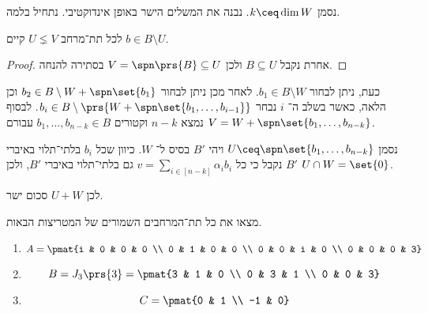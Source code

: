 \documentclass[article, 10pt,oneside]{article}
\begin{document}
\begin{solution}
נסמן
$k \ceq \dim W$.
נבנה את המשלים הישר באופן אינדוקטיבי. נתחיל בלמה.

\begin{lemma}
לכל תת־מרחב
$U \lneq V$
קיים
$b \in B \setminus U$.
\end{lemma}
\begin{proof}
אחרת נקבל
$B \subseteq U$
ולכן
$V = \spn\prs{B} \subseteq U$
בסתירה להנחה.
\end{proof}

כעת, ניתן לבחור
$b_1 \in B \setminus W$.
לאחר מכן ניתן לבחור
$b_2 \in B \setminus W + \spn\set{b_1}$
וכן הלאה, כאשר בשלב ה־%
$i$
נבחר
$b_i \in B \setminus \prs{W + \spn\set{b_1, \ldots, b_{i-1}}}$.
לבסוף נמצא
$n-k$
וקטורים
$b_1, \ldots, b_{n-k} \in B$
עבורם
$V = W + \spn\set{b_1, \ldots, b_{n-k}}$.

נסמן
$U \ceq \spn\set{b_1, \ldots, b_{n-k}}$
ויהי
$B'$
בסיס ל־%
$W$.
כיוון שכל
$b_i$
בלתי־תלוי באיברי
$B'$
נקבל כי כל
$v = \sum_{i \in [n-k]} \alpha_i b_i$
גם בלתי־תלוי באיברי
$B'$,
ולכן
$U \cap W = \set{0}$.

לכן
$U+W$
סכום ישר.
\end{solution}

\begin{exercise}
מצאו את כל תת־המרחבים השמורים של המטריצות הבאות.

\begin{enumerate}
\item
\[A = \pmat{i & 0 & 0 & 0 \\ 0 & 1 & 0 & 0 \\ 0 & 0 & i & 0 \\ 0 & 0 & 0 & 3}\]
\item
\[B = J_3\prs{3} = \pmat{3 & 1 & 0 \\ 0 & 3 & 1 \\ 0 & 0 & 3}\]
\item
\[C = \pmat{0 & 1 \\ -1 & 0}\]
\end{enumerate}
\end{exercise}
\end{document}

